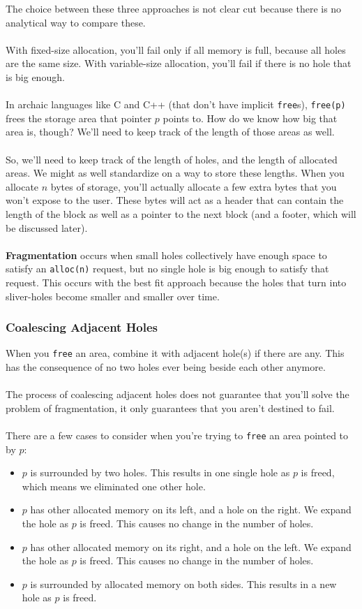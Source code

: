 \documentclass[]{article}
\theoremstyle{definition}
\begin{document}
			The choice between these three approaches is not clear cut because there is no analytical way to compare these.
			\\ \\
			With fixed-size allocation, you'll fail only if all memory is full, because all holes are the same size. With variable-size allocation, you'll fail if there is no hole that is big enough.
			\\ \\
			In archaic languages like C and C++ (that don't have implicit \verb+free+s), \verb+free(p)+ frees the storage area that pointer $p$ points to. How do we know how big that area is, though? We'll need to keep track of the length of those areas as well.
			\\ \\
			So, we'll need to keep track of the length of holes, and the length of allocated areas. We might as well standardize on a way to store these lengths. When you allocate $n$ bytes of storage, you'll actually allocate a few extra bytes that you won't expose to the user. These bytes will act as a header that can contain the length of the block as well as a pointer to the next block (and a footer, which will be discussed later).
			\\ \\
			\textbf{Fragmentation} occurs when small holes collectively have enough space to satisfy an \verb+alloc(n)+ request, but no single hole is big enough to satisfy that request. This occurs with the best fit approach because the holes that turn into sliver-holes become smaller and smaller over time.
		
			\subsubsection{Coalescing Adjacent Holes}
				When you \verb+free+ an area, combine it with adjacent hole(s) if there are any. This has the consequence of no two holes ever being beside each other anymore.
				\\ \\
				The process of coalescing adjacent holes does not guarantee that you'll solve the problem of fragmentation, it only guarantees that you aren't destined to fail.
				\\ \\
				There are a few cases to consider when you're trying to \verb+free+ an area pointed to by $p$:
				\begin{itemize}
					\item $p$ is surrounded by two holes. This results in one single hole as $p$ is freed, which means we eliminated one other hole.
					\item $p$ has other allocated memory on its left, and a hole on the right. We expand the hole as $p$ is freed. This causes no change in the number of holes.
					\item $p$ has other allocated memory on its right, and a hole on the left. We expand the hole as $p$ is freed. This causes no change in the number of holes.
					\item $p$ is surrounded by allocated memory on both sides. This results in a new hole as $p$ is freed.
				\end{itemize}
				
\end{document}
